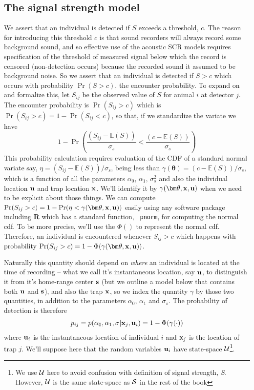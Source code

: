 \subsection{The signal strength model}

We assert that an individual is detected if $S$ exceeds a threshold,
$c$. The reason for introducing this threshold $c$ is that sound
recorders will always record some
background 
sound, and so effective use of the
acoustic SCR models requires specification of the threshold of
measured signal below which the record is censored (non-detection
occurs) because the recorded sound it assumed to be background noise.
So we assert that an individual is detected if $S>c$ which occurs with
probability $\Pr(S > c)$, the encounter probability.  To expand on and
formalize this, let $S_{ij}$ be the observed value of $S$ for animal $i$ at
detector $j$.  The encounter probability is $\Pr(S_{ij}>c)$ which is
$\Pr(S_{ij}>c) = 1- \Pr(S_{ij} < c)$, so that, if we standardize the
variate we have
\[
1-\Pr\left( \frac{ (S_{ij}- \mathbb{E}(S))}{\sigma_{s}}  <  \frac{
(c -  \mathbb{E}(S)) }{\sigma_{s}} \right)
\]
This probability %
calculation requires evaluation of the CDF  of a standard normal variate
say, $\eta = (S_{ij}- \mathbb{E}(S))/\sigma_{s}$, being
less than 
$\gamma({\bm \theta}) = (c -  \mathbb{E}(S))/\sigma_{s}$, 
which is a function of all the parameters $\alpha_{0}$, $\alpha_{1}$,
$\sigma_{s}^{2}$ and also the individual location ${\bf u}$ and trap location
${\bf x}$.
We'll identify it by
$\gamma({\bm \theta},{\bf x},{\bf u})$ when we need to be explicit
about those things.
 We can compute
$\Pr(S_{ij}>c) = 1-\Pr(  \eta <
\gamma({\bm \theta}, {\bf x},{\bf u}))$ easily using any software
package including {\bf R} which has a standard function, \mbox{\tt
  pnorm}, for computing the normal cdf.
To be more precise, we'll use the $\Phi()$ to represent the normal
cdf. Therefore, an individual is encountered whenever $S_{ij}>c$ which
happens with probability
$\Pr(S_{ij}>c) = 1-\Phi( \gamma({\bm \theta}, {\bf x},{\bf u}) )$.

Naturally this quantity should depend on {\it where} an individual is
located at the time of recording
-- what we call it's instantaneous location, say ${\bf u}$, to
distinguish it from it's
 home-range center ${\bf s}$ (but we outline a model below that
 contains both ${\bf u}$ and ${\bf s}$),
and also the trap ${\bf x}$, so we
 index the quantity $\gamma$ by those two quantities, in
addition to the parameters $\alpha_{0}$, $\alpha_{1}$ and $\sigma_{s}$.
The probability of detection is therefore
\[
p_{ij} = p(\alpha_0, \alpha_1, \sigma | {\bf x}_{j}, {\bf u}_{i} ) = 1- \Phi( \gamma(\cdot))
\]
where
 ${\bf u}_{i}$ is the instantaneous location of individual $i$ and
${\bf x}_{j}$ is the location of trap $j$.  We'll suppose here that
the random variables ${\bf u}_{i}$ have state-space ${\cal
  U}$\footnote{We use ${\cal U}$ here to avoid confusion with
  definition of signal strength, $S$. However, ${\cal U}$ is the same
  state-space as ${\cal S}$ in the rest of the book}.

